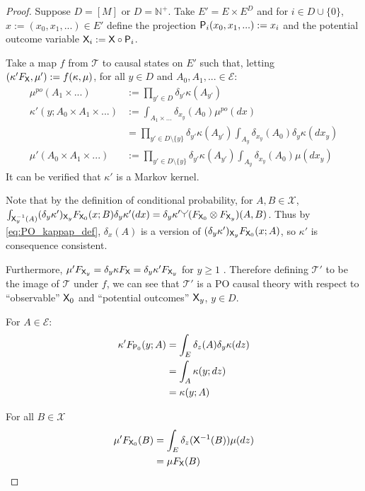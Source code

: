 \begin{proof}
Suppose $D=[M]$ or $D=\mathbb{N}^+$. Take $E' = E\times E^D$ and for $i\in D\cup\{0\}$, $x:=(x_0,x_1,...)\in E'$ define the projection $\mathsf{P}_i(x_0,x_1,...) := x_i$ and the potential outcome variable $\mathsf{X}_i:=\mathsf{X}\circ \mathsf{P}_i$. 

Take a map $f$ from $\mathscr{T}$ to causal states on $E'$ such that, letting $(\kappa' F_{\mathsf{X}},\mu'):=f(\kappa,\mu)$, for all $y\in D$ and $A_0,A_1, ...\in\mathcal{E}$:
\begin{align}
    \mu^{po}(A_1\times...) &:= \prod_{y'\in D} \delta_{y'} \kappa (A_{y'})\\
    \kappa' (y; A_0\times A_1\times...) &:= \int_{A_1\times ...} \delta_{x_y} (A_0) \mu^{po}(dx) \\
    &= \prod_{y'\in D\setminus\{y\}} \delta_{y'} \kappa (A_{y'}) \int_{A_y} \delta_{x_y} (A_0) \delta_y \kappa(dx_y) \label{eq:PO_kappap_def}\\
    \mu' ( A_0\times A_1\times...) &:= \prod_{y'\in D\setminus\{y\}} \delta_{y'} \kappa (A_{y'}) \int_{A_y} \delta_{x_y} (A_0) \mu(dx_y) \label{eq:consist}
\end{align}
It can be verified that $\kappa'$ is a Markov kernel.

Note that by the definition of conditional probability, for $A,B\in \mathcal{X}$, $\int_{\RV{X}_y^{-1}(A)} (\delta_y \kappa')_{\RV{X}_y} F_{\RV{X}_0} (x;B) \delta_y\kappa' (dx)=\delta_y \kappa' \splitter{0.13}(F_{\RV{X}_0}\otimes F_{\RV{X}_y}) (A, B)$. Thus by \ref{eq:PO_kappap_def}, $\delta_x (A)$ is a version of $(\delta_y \kappa')_{\mathsf{X}_y} F_{\mathsf{X}_0} (x;A)$, so $\kappa'$ is consequence consistent.

Furthermore, $\mu' F_{\mathsf{X}_y}=\delta_y \kappa F_{\mathsf{X}}=\delta_y \kappa' F_{\mathsf{X}_y}$ for $y\geq 1$ . Therefore defining $\mathscr{T}'$ to be the image of $\mathscr{T}$ under $f$, we can see that $\mathscr{T}'$ is a PO causal theory with respect to ``observable'' $\mathsf{X}_0$ and ``potential outcomes'' $\mathsf{X}_y$, $y\in D$.

For $A\in \mathcal{E}$:
\begin{align}
    \kappa' F_{\mathsf{P}_0} (y;A) &= \int_E \delta_{z} (A) \delta_y \kappa (dz)\\
                               &= \int_{A} \kappa(y;dz)\\
                               &= \kappa (y;A)
\end{align}


For all $B\in\mathscr{X}$
\begin{align}
    \mu' F_{\mathsf{X}_0} (B) &= \int_E \delta_{z} (\mathsf{X}^{-1}(B)) \mu (dz)\\
                               &= \mu F_{\mathsf{X}} (B)
\end{align}


\end{proof}
